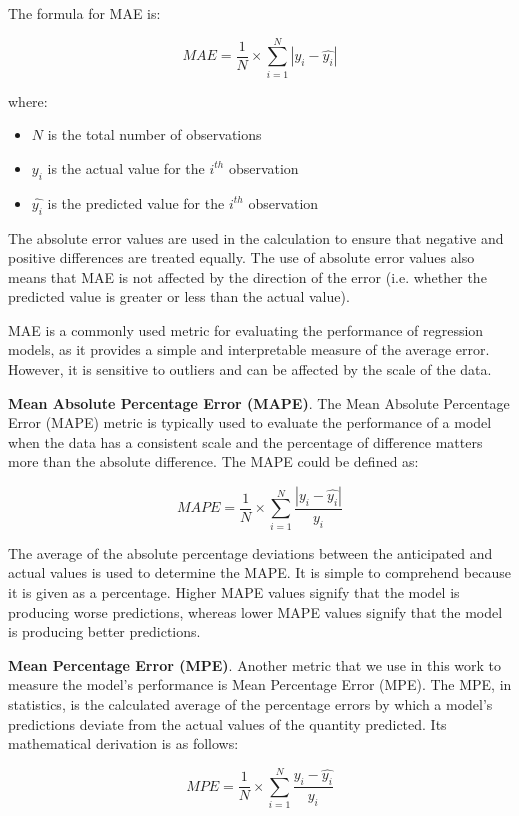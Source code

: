 \documentclass[a4paper]{article}
\begin{document}
The formula for MAE is:

$$
MAE = \frac{1}{N} \times \sum_{i=1}^{N}|y_{i}-\hat{y_{i}}|
$$

where:
\begin{itemize}
    \item $N$ is the total number of observations
    \item $y_{i}$ is the actual value for the $i^{th}$ observation
    \item $\hat{y_{i}}$ is the predicted value for the $i^{th}$ observation
\end{itemize}

The absolute error values are used in the calculation to ensure that negative and positive differences are treated equally. The use of absolute error values also means that MAE is not affected by the direction of the error (i.e. whether the predicted value is greater or less than the actual value).

MAE is a commonly used metric for evaluating the performance of regression models, as it provides a simple and interpretable measure of the average error. However, it is sensitive to outliers and can be affected by the scale of the data.

\textbf{Mean Absolute Percentage Error (MAPE)}. The Mean Absolute Percentage Error (MAPE) metric is typically used to evaluate the performance of a model when the data has a consistent scale and the percentage of difference matters more than the absolute difference. The MAPE could be defined as:

$$
MAPE = \frac{1}{N} \times \sum_{i=1}^{N}{\frac{|y_{i}-\hat{y_{i}}|}{y_{i}}}
$$

The average of the absolute percentage deviations between the anticipated and actual values is used to determine the MAPE. It is simple to comprehend because it is given as a percentage. Higher MAPE values signify that the model is producing worse predictions, whereas lower MAPE values signify that the model is producing better predictions.


\textbf{Mean Percentage Error (MPE)}. Another metric that we use in this work to measure the model's performance is Mean Percentage Error (MPE). The MPE, in statistics, is the calculated average of the percentage errors by which a model's predictions deviate from the actual values of the quantity predicted. Its mathematical derivation is as follows:

$$
MPE = \frac{1}{N} \times \sum_{i=1}^{N}{\frac{y_{i}-\hat{y_{i}}}{y_{i}}}
$$
\end{document}
